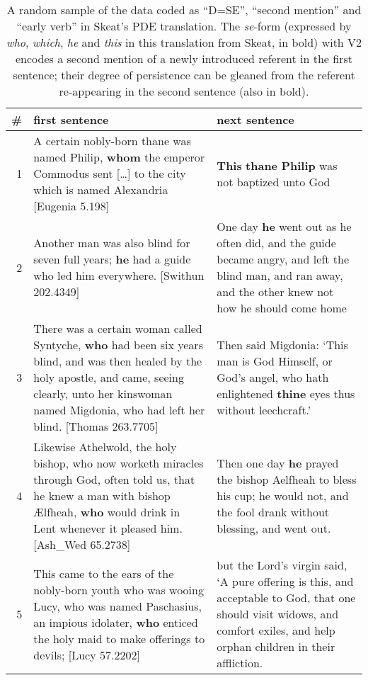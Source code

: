 \documentclass[output=paper,colorlinks,citecolor=brown]{langscibook}
\begin{document}
\begin{table}[p]
\caption{A random sample of the data coded as “D=SE”, “second mention” and “early verb” in Skeat's PDE translation. The \textit{se}{}-form (expressed by \textit{who}, \textit{which}, \textit{he} and \textit{this} in this translation from Skeat, in bold) with V2 encodes a second mention of a newly introduced referent in the first sentence; their degree of persistence can be gleaned from the referent re-appearing in the second sentence (also in bold).}
\label{tab:los:3}
\begin{tabularx}{\textwidth}{rQQ}
\lsptoprule
{\#} & {first sentence} & {next sentence}\\
\midrule
{1} & {A certain nobly-born thane was named Philip, \textbf{whom} the emperor Commodus sent […] to the city which is named Alexandria [Eugenia 5.198]} & {\textbf{This} \textbf{thane} \textbf{Philip} was not baptized unto God}\\
{2} & {Another man was also blind for seven full years; \textbf{he} had a guide who led him everywhere. [Swithun 202.4349]} & {One day \textbf{he} went out as he often did, and the guide became angry, and left the blind man, and ran away, and the other knew not how he should come home}\\
{3} & {There was a certain woman called Syntyche, \textbf{who} had been six years blind, and was then healed by the holy apostle, and came, seeing clearly, unto her kinswoman named Migdonia, who had left her blind. [Thomas 263.7705]} & {Then said Migdonia: `This man is God Himself, or God's angel, who hath enlightened \textbf{thine} eyes thus without leechcraft.'}\\
{4} & {Likewise Athelwold, the holy bishop, who now worketh miracles through God, often told us, that he knew a man with bishop Ælfheah, \textbf{who} would drink in Lent whenever it pleased him. [Ash\_Wed 65.2738]} & {Then one day \textbf{he} prayed the bishop Aelfheah to bless his cup; he would not, and the fool drank without blessing, and went out.}\\
{5} & {This came to the ears of the nobly-born youth who was wooing Lucy, who was named Paschasius, an impious idolater, \textbf{who} enticed the holy maid to make offerings to devils; [Lucy 57.2202]} & {but the Lord's virgin said, `A pure offering is this, and acceptable to God, that one should visit widows, and comfort exiles, and help orphan children in their affliction.}\\
\midrule
\end{tabularx}
\end{table}
\end{document}
